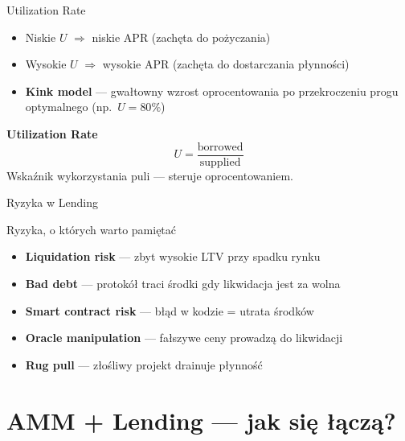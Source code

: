 \begin{frame}{Utilization Rate}
  \begin{itemize}
    \item Niskie $U$ $\Rightarrow$ niskie APR (zachęta do pożyczania)
    \item Wysokie $U$ $\Rightarrow$ wysokie APR (zachęta do dostarczania płynności)
    \item \textbf{Kink model} --- gwałtowny wzrost oprocentowania po przekroczeniu progu optymalnego (np.\ $U = 80\%$)
  \end{itemize}
  \vspace{0.3cm}
  \begin{block}{\textbf{Utilization Rate}}
    \[
      U = \frac{\text{borrowed}}{\text{supplied}}
    \]
    Wskaźnik wykorzystania puli --- steruje oprocentowaniem.
  \end{block}
\end{frame}

\begin{frame}{Ryzyka w Lending}
  \begin{alertblock}{Ryzyka, o których warto pamiętać}
    \begin{itemize}
      \item \textbf{Liquidation risk} --- zbyt wysokie LTV przy spadku rynku
      \item \textbf{Bad debt} --- protokół traci środki gdy likwidacja jest za wolna
      \item \textbf{Smart contract risk} --- błąd w kodzie = utrata środków
      \item \textbf{Oracle manipulation} --- fałszywe ceny prowadzą do likwidacji
      \item \textbf{Rug pull} --- złośliwy projekt drainuje płynność
    \end{itemize}
  \end{alertblock}
\end{frame}

\section{AMM + Lending --- jak się łączą?}

